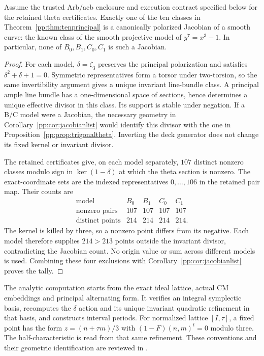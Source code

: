\begin{theorem}
\label{pp:thm:jacobiancomplete}
Assume the trusted Arb/acb enclosure and execution contract specified
below for the retained theta certificates. Exactly one of the ten
classes in Theorem~\ref{pp:thm:tenprincipal} is a canonically polarized
Jacobian of a smooth curve: the known class of the smooth projective
model of $y^7=x^3-1$. In particular, none of $B_0,B_1,C_0,C_1$ is
such a Jacobian.
\end{theorem}
\begin{proof}
For each model, $\delta=\zeta_3$ preserves the principal polarization
and satisfies $\delta^2+\delta+1=0$. Symmetric representatives form
a torsor under two-torsion, so the same invertibility argument gives
a unique invariant line-bundle class. A principal ample line bundle
has a one-dimensional space of sections, hence determines a unique
effective divisor in this class. Its support is stable under negation.
If a B/C model were a Jacobian, the necessary geometry in
Corollary~\ref{pp:cor:jacobianlist} would identify this divisor with
the one in Proposition~\ref{pp:prop:trigonaltheta}. Inverting the
deck generator does not change its fixed kernel or invariant divisor.

The retained certificates give, on each model separately, $107$
distinct nonzero classes modulo sign in $\ker(1-\delta)$ at which
the theta section is nonzero. The exact-coordinate sets are the
indexed representatives $0,\ldots,106$ in the retained pair map.
Their counts are
\[
\begin{array}{c|rrrr}
\text{model}&B_0&B_1&C_0&C_1\\\hline
\text{nonzero pairs}&107&107&107&107\\
\text{distinct points}&214&214&214&214.
\end{array}
\]
The kernel is killed by three, so a nonzero point differs from its
negative. Each model therefore supplies $214>213$ points outside
the invariant divisor, contradicting the Jacobian count. No origin
value or sum across different models is used. Combining these four
exclusions with Corollary~\ref{pp:cor:jacobianlist} proves the tally.
\end{proof}

The analytic computation starts from the exact ideal lattice, actual
CM embeddings and principal alternating form. It verifies an integral
symplectic basis, recomputes the $\delta$ action and its unique
invariant quadratic refinement in that basis, and constructs interval
periods. For normalized lattice $[I,\tau]$, a fixed point has the
form $z=(n+\tau m)/3$ with $(1-F)(n,m)^t=0$ modulo three.
The half-characteristic is read from that same refinement. These
conventions and their geometric identification are reviewed in
.


